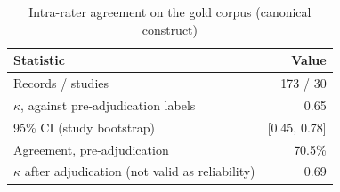 \begin{table}[htbp]
\centering
\footnotesize
\caption{Intra-rater agreement on the gold corpus (canonical construct)}
\label{tab:C8}
\begin{tabular}{lr}
\toprule
Statistic & Value \\
\midrule
Records / studies & 173 / 30 \\
$\kappa$, against pre-adjudication labels & 0.65 \\
95\% CI (study bootstrap) & [0.45, 0.78] \\
Agreement, pre-adjudication & 70.5\% \\
$\kappa$ after adjudication (not valid as reliability) & 0.69 \\
\bottomrule
\end{tabular}
\par{}
\end{table}
